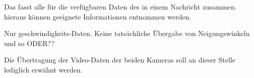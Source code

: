 Das  fasst alle für die verfügbaren Daten des \Quad[s] in einem Nachricht zusammen. hieraus können geeignete Informationen entnommen werden.


Nur geschwindigkeits-Daten. Keine tatsächliche Übergabe von Neigungswinkeln und so ODER??
\missing\







Die Übertragung der Video-Daten der beiden Kameras soll an dieser Stelle lediglich erwähnt werden.












































